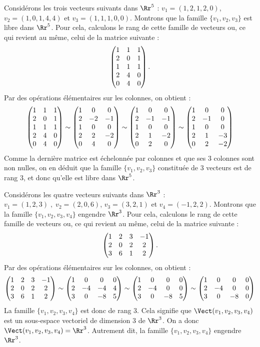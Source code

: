 \documentclass[class=report,crop=false]{standalone}
\begin{document}
\begin{exemple}
Considérons les trois vecteurs suivants dans $\Rr^5$ :
$v_1=(1,2,1,2,0)$, $v_2 = (1,0,1,4,4)$ et $v_3=(1,1,1,0,0)$.
Montrons que la famille $\{v_1, v_2 ,v_3\}$ est libre dans $\Rr^5$.
Pour cela, calculons le rang de cette famille de vecteurs ou,
ce qui revient au m\^eme, celui  de la matrice suivante :
$$\begin{pmatrix}
1&1&1\cr
2&0&1\cr
1&1&1\cr
2&4&0\cr
0&4&0\cr
\end{pmatrix}.$$
Par des opérations élémentaires sur les colonnes, on obtient :
$$\begin{pmatrix}
1&1&1\cr
2&0&1\cr
1&1&1\cr
2&4&0\cr
0&4&0\cr
\end{pmatrix}\sim
\begin{pmatrix}
1&0&0\cr
2&-2&-1\cr
1&0&0\cr
2&2&-2\cr
0&4&0\cr
\end{pmatrix}\sim
\begin{pmatrix}
1&0&0\cr
2&-1&-1\cr
1&0&0\cr
2&1&-2\cr
0&2&0\cr
\end{pmatrix}\sim
\begin{pmatrix}
1&0&0\cr
2&-1&0\cr
1&0&0\cr
2&1&-3\cr
0&2&-2\cr
\end{pmatrix}$$
Comme la dernière matrice est échelonnée par colonnes
et que ses $3$ colonnes sont non nulles, on en déduit que la
famille $\{v_1, v_2 ,v_3\}$ constituée de $3$ vecteurs est
de rang $3$, et donc qu'elle est libre dans $\Rr^5$.
\end{exemple}

\begin{exemple}
Considérons les quatre vecteurs suivants dans $\Rr^3$ :
$v_1=(1,2,3)\;, \;v_2 = (2,0,6)$, $v_3=(3,2,1)$ et $v_4=(-1,2,2)$.
Montrons que la famille $\{v_1, v_2 ,v_3, v_4\}$ engendre $\Rr^3$.
Pour cela, calculons le rang de cette famille de vecteurs ou,
ce qui revient au m\^eme, celui  de la matrice suivante :
 $$\begin{pmatrix}
1&2&3&-1\cr
2&0&2&2\cr
3&6&1&2\cr
\end{pmatrix}.$$
Par des opérations élémentaires sur les colonnes, on obtient :
$$\begin{pmatrix}
1&2&3&-1\cr
2&0&2&2\cr
3&6&1&2\cr
\end{pmatrix}\sim
\begin{pmatrix}
1&0&0&0\cr
2&-4&-4&4\cr
3&0&-8&5\cr
\end{pmatrix}\sim
\begin{pmatrix}
1&0&0&0\cr
2&-4&0&0\cr
3&0&-8&5\cr
\end{pmatrix}\sim
\begin{pmatrix}
1&0&0&0\cr
2&-4&0&0\cr
3&0&-8&0\cr
\end{pmatrix}$$
La famille $\{v_1, v_2 ,v_3, v_4\}$ est donc de rang $3$.
Cela signifie que
$\Vect (v_1, v_2 ,v_3, v_4)$ est un sous-espace vectoriel
de dimension $3$ de $\Rr^3$. On a donc
$\Vect (v_1, v_2 ,v_3, v_4 ) = \Rr^3$. Autrement dit,
la famille $\{v_1, v_2 ,v_3, v_4\}$ engendre $\Rr^3$.
\end{exemple}
\end{document}
